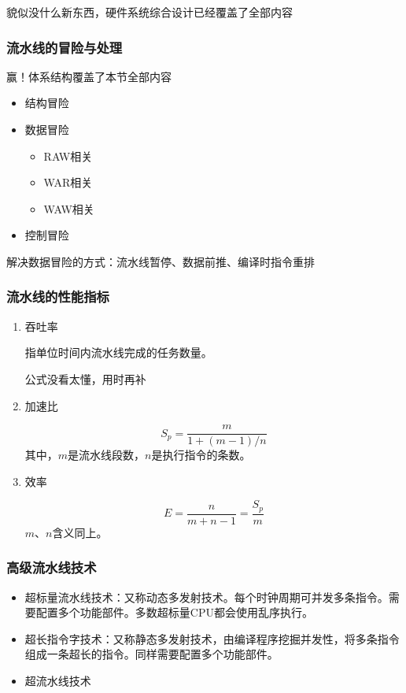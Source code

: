 \documentclass[12pt, a4paper, oneside]{ctexart}
\begin{document}
貌似没什么新东西，硬件系统综合设计已经覆盖了全部内容

\subsubsection{流水线的冒险与处理}

赢！体系结构覆盖了本节全部内容

\begin{itemize}
  \item 结构冒险
  \item 数据冒险
  \begin{itemize}
    \item RAW相关
    \item WAR相关
    \item WAW相关
  \end{itemize}
  \item 控制冒险
\end{itemize}

解决数据冒险的方式：流水线暂停、数据前推、编译时指令重排

\subsubsection{流水线的性能指标}

\begin{enumerate}
  \item 吞吐率
  
  指单位时间内流水线完成的任务数量。

  公式没看太懂，用时再补
  \item 加速比
  
  \begin{equation*}
    S_p=\frac{m}{1+(m-1)/n}
  \end{equation*}
  其中，$m$是流水线段数，$n$是执行指令的条数。
  \item 效率
  
  \begin{equation*}
    E=\frac{n}{m+n-1}=\frac{S_p}{m}
  \end{equation*}
  $m$、$n$含义同上。
\end{enumerate}

\subsubsection{高级流水线技术}

\begin{itemize}
  \item 超标量流水线技术：又称动态多发射技术。每个时钟周期可并发多条指令。需要配置多个功能部件。多数超标量CPU都会使用乱序执行。
  \item 超长指令字技术：又称静态多发射技术，由编译程序挖掘并发性，将多条指令组成一条超长的指令。同样需要配置多个功能部件。
  \item 超流水线技术
\end{itemize}
\end{document}
